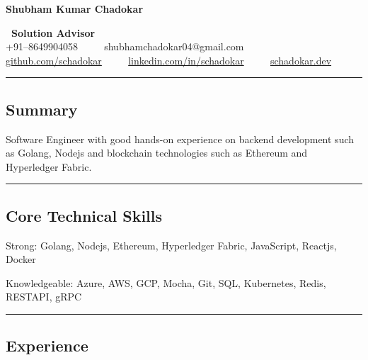 \documentclass[11pt,a4paper]{article}
\newenvironment{indentsection}[1]%
{\begin{list}{}%
	{\setlength{\leftmargin}{#1}}%
	\item[]%
}
{\end{list}}
\begin{document}
\begin{center}
{\Huge \textbf{Shubham Kumar Chadokar}} 

\textbf{\large\ \textbf{Solution Advisor}} \\


+91--8649904058 \ \ \textbullet
\ \ shubhamchadokar04@gmail.com
\\

 {{\href{https://github.com/schadokar}{{github.com/schadokar}}}} \ \ \textbullet 
\ \ {{\href {https://www.linkedin.com/in/schadokar/}{{linkedin.com/in/schadokar}}}} \ \ \textbullet
\ \ {{\href {https://schadokar.dev}{{schadokar.dev}}}} \ \ \
\end{center}

\hrule
\vspace{-0.4em}
\subsection*{Summary}

Software Engineer with good hands-on experience on backend development such as Golang, Nodejs and blockchain technologies such as Ethereum and Hyperledger Fabric. 

\vspace{0.4em}

             
\hrule
\vspace{-0.4em}
\subsection*{Core Technical Skills}

\begin{indentsection}{\parindent}
\begin{description*}
	\item[Strong:]
	Golang, Nodejs, Ethereum, Hyperledger Fabric, JavaScript, Reactjs, Docker
	\item[Knowledgeable:]
	Azure, AWS, GCP, Mocha, Git, SQL, Kubernetes, Redis, RESTAPI, gRPC\end{description*}
\end{indentsection}

\hrule
\vspace{-0.4em}
\subsection*{Experience}
\end{document}
